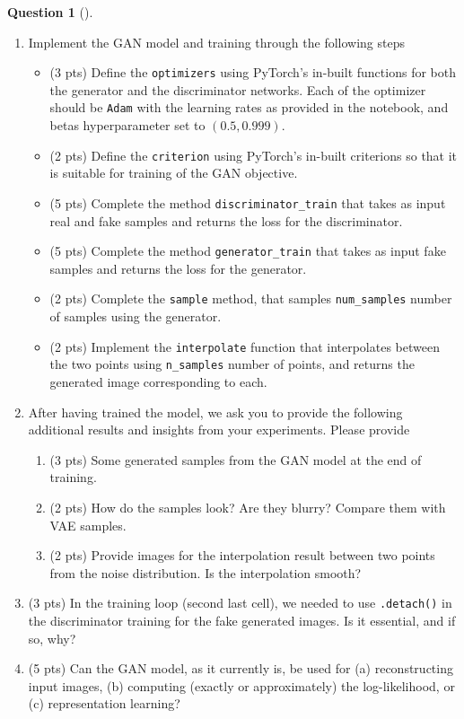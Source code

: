 \documentclass[12pt]{article}
\theoremstyle{definition}
\newtheorem{exercise}{Question}%
\begin{document}
\begin{exercise}[]
\begin{enumerate}
\item Implement the GAN model and training through the following steps
    \begin{itemize}
        \item (3 pts) Define the \texttt{optimizers} using PyTorch's in-built functions for both the generator and the discriminator networks. Each of the optimizer should be \texttt{Adam} with the learning rates as provided in the notebook, and betas hyperparameter set to $(0.5, 0.999)$.
        \item (2 pts) Define the \texttt{criterion} using PyTorch's in-built criterions so that it is suitable for training of the GAN objective. 
        \item (5 pts) Complete the method \texttt{discriminator\_train} that takes as input real and fake samples and returns the loss for the discriminator.
        \item (5 pts) Complete the method \texttt{generator\_train} that takes as input fake samples and returns the loss for the generator.
        \item (2 pts) Complete the \texttt{sample} method, that samples \texttt{num\_samples} number of samples using the generator.
        \item (2 pts) Implement the \texttt{interpolate} function that interpolates between the two points using \texttt{n\_samples} number of points, and returns the generated image corresponding to each.
    \end{itemize}
\item After having trained the model, we ask you to provide the following additional results and insights from your experiments. Please provide
\begin{enumerate}
    \item (3 pts) Some generated samples from the GAN model at the end of training.
    \item (2 pts) How do the samples look? Are they blurry? Compare them with VAE samples.
    \item (2 pts) Provide images for the interpolation result between two points from the noise distribution. Is the interpolation smooth?
\end{enumerate}
\item (3 pts) In the training loop (second last cell), we needed to use \texttt{.detach()} in the discriminator training for the fake generated images. Is it essential, and if so, why?
\item (5 pts) Can the GAN model, as it currently is, be used for (a) reconstructing input images, (b) computing (exactly or approximately) the log-likelihood, or (c) representation learning?
\end{enumerate}
\end{exercise}
\end{document}

